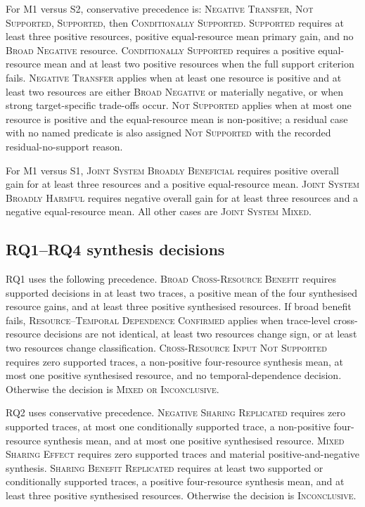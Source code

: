 \documentclass[a4paper,11pt]{article}
\begin{document}
For M1 versus S2, conservative precedence is: \textsc{Negative Transfer},
\textsc{Not Supported}, \textsc{Supported}, then \textsc{Conditionally
Supported}.  \textsc{Supported} requires at least three positive resources,
positive equal-resource mean primary gain, and no \textsc{Broad Negative}
resource.  \textsc{Conditionally Supported} requires a positive equal-resource
mean and at least two positive resources when the full support criterion fails.
\textsc{Negative Transfer} applies when at least one resource is positive and
at least two resources are either \textsc{Broad Negative} or materially
negative, or when strong target-specific trade-offs occur.  \textsc{Not
Supported} applies when at most one resource is positive and the equal-resource
mean is non-positive; a residual case with no named predicate is also assigned
\textsc{Not Supported} with the recorded residual-no-support reason.

For M1 versus S1, \textsc{Joint System Broadly Beneficial} requires positive
overall gain for at least three resources and a positive equal-resource mean.
\textsc{Joint System Broadly Harmful} requires negative overall gain for at
least three resources and a negative equal-resource mean.  All other cases are
\textsc{Joint System Mixed}.

\subsection*{RQ1--RQ4 synthesis decisions}

RQ1 uses the following precedence.  \textsc{Broad Cross-Resource Benefit}
requires supported decisions in at least two traces, a positive mean of the
four synthesised resource gains, and at least three positive synthesised
resources.  If broad benefit fails, \textsc{Resource--Temporal Dependence
Confirmed} applies when trace-level cross-resource decisions are not identical,
at least two resources change sign, or at least two resources change
classification.  \textsc{Cross-Resource Input Not Supported} requires zero
supported traces, a non-positive four-resource synthesis mean, at most one
positive synthesised resource, and no temporal-dependence decision.  Otherwise
the decision is \textsc{Mixed or Inconclusive}.

RQ2 uses conservative precedence.  \textsc{Negative Sharing Replicated}
requires zero supported traces, at most one conditionally supported trace, a
non-positive four-resource synthesis mean, and at most one positive synthesised
resource.  \textsc{Mixed Sharing Effect} requires zero supported traces and
material positive-and-negative synthesis.  \textsc{Sharing Benefit Replicated}
requires at least two supported or conditionally supported traces, a positive
four-resource synthesis mean, and at least three positive synthesised
resources.  Otherwise the decision is \textsc{Inconclusive}.
\end{document}
